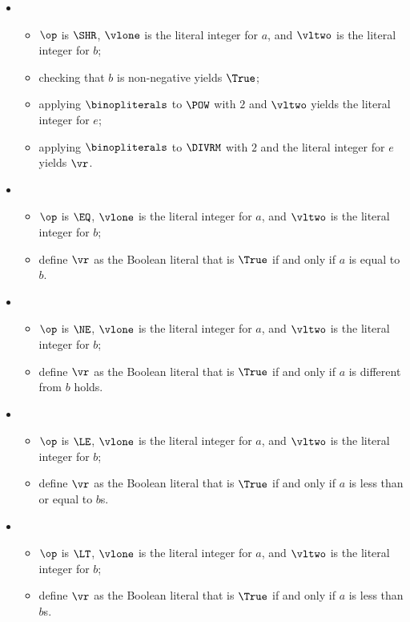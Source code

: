 \begin{itemize}
  \item {}
  \begin{itemize}
    \item $\op$ is $\SHR$, $\vlone$ is the literal integer for $a$, and $\vltwo$ is the literal integer for $b$;
    \item checking that $b$ is non-negative yields $\True$\ProseOrTypeError;
    \item applying $\binopliterals$ to $\POW$ with $2$ and $\vltwo$ yields the literal integer for $e$;
    \item applying $\binopliterals$ to $\DIVRM$ with $2$ and the literal integer for $e$ yields $\vr$.
  \end{itemize}

  \item {}
  \begin{itemize}
    \item $\op$ is $\EQ$, $\vlone$ is the literal integer for $a$, and $\vltwo$ is the literal integer for $b$;
    \item define $\vr$ as the Boolean literal that is $\True$ if and only if $a$ is equal to $b$.
  \end{itemize}

  \item {}
  \begin{itemize}
    \item $\op$ is $\NE$, $\vlone$ is the literal integer for $a$, and $\vltwo$ is the literal integer for $b$;
    \item define $\vr$ as the Boolean literal that is $\True$ if and only if $a$ is different from $b$ holds.
  \end{itemize}

  \item {}
  \begin{itemize}
    \item $\op$ is $\LE$, $\vlone$ is the literal integer for $a$, and $\vltwo$ is the literal integer for $b$;
    \item define $\vr$ as the Boolean literal that is $\True$ if and only if $a$ is less than or equal to $b$s.
  \end{itemize}

  \item {}
  \begin{itemize}
    \item $\op$ is $\LT$, $\vlone$ is the literal integer for $a$, and $\vltwo$ is the literal integer for $b$;
    \item define $\vr$ as the Boolean literal that is $\True$ if and only if $a$ is less than $b$s.
  \end{itemize}


\end{itemize}
